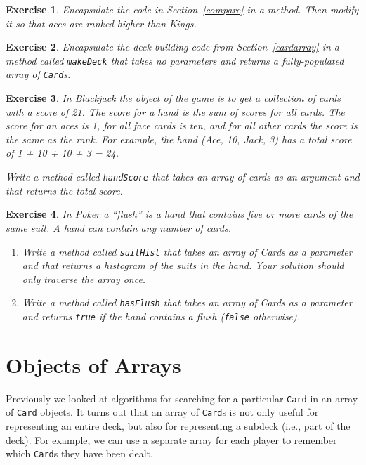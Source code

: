 \documentclass[12pt]{book}
\theoremstyle{exercise}
\newtheorem{exercise}{Exercise}[chapter]
\newcommand{\java}[1]{\verb"#1"}
\newcommand{\java}[1]{\lstinline{#1}} %
\begin{document}
\begin{exercise}
Encapsulate the code in Section~\ref{compare} in a method.
Then modify it so that aces are ranked higher than Kings.
\end{exercise}


\begin{exercise}
Encapsulate the deck-building code from Section~\ref{cardarray} in a method called \java{makeDeck} that takes no parameters and returns a fully-populated array of \java{Card}s.
\end{exercise}


\begin{exercise}
In Blackjack the object of the game is to get a collection of cards with a score of 21.
The score for a hand is the sum of scores for all cards.
The score for an aces is 1, for all face cards is ten, and for all other cards the score is the same as the rank.
For example, the hand (Ace, 10, Jack, 3) has a total score of 1 + 10 + 10 + 3 = 24.

Write a method called \java{handScore} that takes an array of cards as an argument and that returns the total score.
\end{exercise}


\begin{exercise}
In Poker a ``flush'' is a hand that contains five or more cards of the same suit.
A hand can contain any number of cards.

\begin{enumerate}

\item Write a method called \java{suitHist} that takes an array of Cards as a parameter and that returns a histogram of the suits in the hand.
Your solution should only traverse the array once.

\item Write a method called \java{hasFlush} that takes an array of Cards as a parameter and returns \java{true} if the hand contains a flush (\java{false} otherwise).

\end{enumerate}

\end{exercise}


\chapter{Objects of Arrays}


Previously we looked at algorithms for searching for a particular \java{Card} in an array of \java{Card} objects.
It turns out that an array of \java{Card}s is not only useful for representing an entire deck, but also for representing a subdeck (i.e., part of the deck).
For example, we can use a separate array for each player to remember which \java{Card}s they have been dealt.
\end{document}
